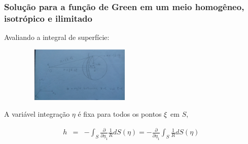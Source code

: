 \documentclass{beamer}
\newcommand{\xivec}{\boldmath \xi}
\begin{document}
\begin{frame}
	\frametitle{\textbf{Solu\c{c}\~ao para a fun\c{c}\~ao de Green em um meio homog\^eneo, isotr\'opico e ilimitado}}
	
	\begin{flushleft}
		\textcolor{red!60!black}{Avaliando a integral de superf\'icie:}
	\end{flushleft}
	
	\begin{figure}[h!]   
		\includegraphics[width=218px, height=100px]{Fig11.jpg}       
	\end{figure}
	\begin{flushleft}
		A vari\'avel integra\c{c}\~ao $\eta$ \'e fixa para todos os pontos $\xivec$ em $S$, 
	\end{flushleft}
	\begin{eqnarray}
	\label{ten1}
	h &=& - \int_{S}\frac{\partial }{\partial \eta_{1}} \frac{1}{R} dS(\eta)  = - \frac{\partial }{\partial \eta_{1}}\int_{S} \frac{1}{R} dS(\eta) \, 
	\end{eqnarray}
	
\end{frame}%
\end{document}
